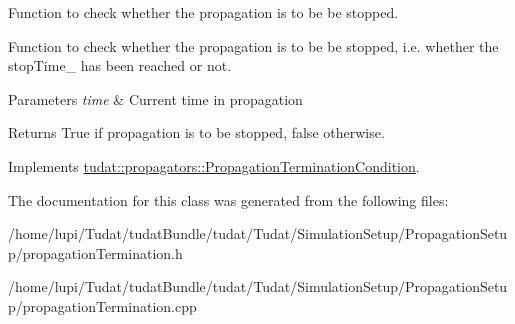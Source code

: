 Function to check whether the propagation is to be be stopped. 

Function to check whether the propagation is to be be stopped, i.\+e. whether the stop\+Time\+\_\+ has been reached or not. 
\begin{DoxyParams}{Parameters}
{\em time} & Current time in propagation \\
\hline
\end{DoxyParams}
\begin{DoxyReturn}{Returns}
True if propagation is to be stopped, false otherwise. 
\end{DoxyReturn}


Implements \hyperlink{classtudat_1_1propagators_1_1PropagationTerminationCondition_a2a53592475bbfb408fd12faf21c5f3be}{tudat\+::propagators\+::\+Propagation\+Termination\+Condition}.



The documentation for this class was generated from the following files\+:\begin{DoxyCompactItemize}
\item 
/home/lupi/\+Tudat/tudat\+Bundle/tudat/\+Tudat/\+Simulation\+Setup/\+Propagation\+Setup/propagation\+Termination.\+h\item 
/home/lupi/\+Tudat/tudat\+Bundle/tudat/\+Tudat/\+Simulation\+Setup/\+Propagation\+Setup/propagation\+Termination.\+cpp\end{DoxyCompactItemize}
